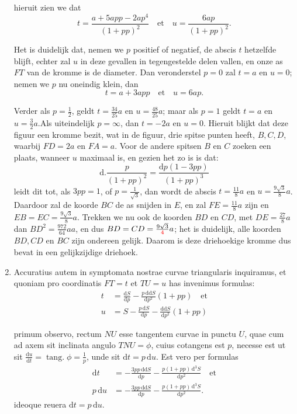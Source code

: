\documentclass[10pt,a4paper]{article}
\DeclareMathOperator{\tang}{tang.}
\def\D{\mathrm{d}}
\begin{document}
\begin{paracol}{2}
\begin{enumerate}[topsep=1px]
		hieruit zien we dat
		\[
			t = \frac{a+5app-2ap^4}{(1+pp)^2}\quad \text{et} \quad u = \frac{6ap}{(1+pp)^2}.
		\]
		\par Het is duidelijk dat, nemen we $p$ positief of negatief, de abscis $t$ hetzelfde blijft, echter zal $u$ in deze gevallen in tegengestelde delen vallen, en onze as $FT$ van de kromme is de diameter. Dan veronderstel $p=0$ zal $t=a$ en $u=0$; nemen we $p$ nu oneindig klein, dan
		\[
			t = a + 3app\quad \text{et} \quad u= 6ap.
		\]
		\par Verder als $p=\frac{1}{2}$, geldt $t = \frac{34}{25}a$ en $u= \frac{48}{25}a$; maar als $p=1$ geldt $t=a$ en $u=\frac{3}{2}a$.Als uiteindelijk $p=\infty$, dan $t=-2a$ en $u=0$. Hieruit blijkt dat deze figuur een kromme bezit, wat in de figuur, drie spitse punten heeft, $B,C,D$, waarbij $FD=2a$ en $FA=a$. Voor de andere spitsen $B$ en $C$ zoeken een plaats, wanneer $u$ maximaal is, en gezien het zo is is dat:
		\[
			\D.\frac{p}{(1+pp)^2} = \frac{\D p(1-3pp)}{(1+pp)^3}
		\]
		leidt dit tot, als $3pp=1$, of $p=\frac{1}{\sqrt{3}}$, dan wordt de abscis $t=\frac{11}{8}a$ en $u=\frac{9\sqrt{3}}{8}a$. Daardoor zal de koorde $BC$ de as snijden in $E$, en zal $FE=\frac{11}{8}a$ zijn en $EB=EC=\frac{9\sqrt{3}}{8}a$. Trekken we nu ook de koorden $BD$ en $CD$, met $DE=\frac{27}{8}a$ dan $BD^2 = \frac{972}{64}aa$, en dus $BD=CD = \frac{9\sqrt{3}}{\color{red}4}a$; het is duidelijk, alle koorden $BD, CD$ en $BC$ zijn ondereen gelijk. Daarom is deze driehoekige kromme dus bevat in een gelijkzijdige driehoek.

		\switchcolumn*
		
		\item Accuratius autem in symptomata nostrae curvae triangularis inquiramus, et quoniam pro coordinatis $FT=t$ et $TU=u$ has invenimus formulas:
		\begin{align*}
			t & = \frac{\D S}{\D p}-\frac{p\,\D \D S}{\D p^2}(1+pp)\quad\text{et}\\
			u & = S-\frac{p\,\D S}{\D p}-\frac{\D\D S}{\D p^2}(1+pp)
		\end{align*}
		\par primum observo, rectum $NU$ esse tangentem curvae in punctu $U$, quae cum ad axem sit inclinata angulo $TNU=\phi$, cuius cotangens est $p$, necesse est ut sit $\frac{\D u}{\D t} = \tang \phi = \frac{1}{p}$, unde sit $\D t = p\, \D u$. Est vero per formulas
		\begin{align*}
			\D t &= -\frac{3pp\, \D\D S}{\D p}-\frac{p(1+pp)\, \D^3S}{\D p^2} \quad \text{et}\\
			p\, \D u &= - \frac{3pp \, \D \D S}{\D p} - \frac{p(1+pp)\, \D^3S}{\D p^2}.
		\end{align*}
		ideoque reuera $\D t=p\, \D u$.
		

\end{enumerate}
\end{paracol}
\end{document}
